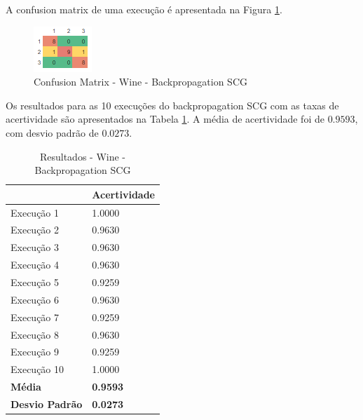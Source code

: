 A confusion matrix de uma execução é apresentada na Figura \ref{figura-confusion-matrix-wine-backpropagation-scg}.

\begin{figure}[h!]
  \centering
  \includegraphics[width=0.3\linewidth]{figs/confusion-matrix-wine-backpropagation-scg.png}
  \caption{Confusion Matrix - Wine - Backpropagation SCG}
  \label{figura-confusion-matrix-wine-backpropagation-scg}
\end{figure}

Os resultados para as 10 execuções do backpropagation SCG com as taxas de acertividade são apresentados na Tabela \ref{tabela-resultado-wine-scg}. A média de acertividade foi de $0.9593$, com desvio padrão de $0.0273$.

\begin{table}[h!]
\centering
\caption{Resultados - Wine - Backpropagation SCG}
\label{tabela-resultado-wine-scg}
\begin{tabular}{ll}
\toprule
                       & \textbf{Acertividade}       \\ \midrule
Execução 1             & 1.0000          \\
Execução 2             & 0.9630          \\
Execução 3             & 0.9630           \\
Execução 4             & 0.9630          \\
Execução 5             & 0.9259           \\
Execução 6             & 0.9630          \\
Execução 7             & 0.9259           \\
Execução 8             & 0.9630           \\
Execução 9             & 0.9259          \\
Execução 10            & 1.0000          \\ \bottomrule
\textbf{Média}         & \textbf{0.9593} \\
\textbf{Desvio Padrão} & \textbf{0.0273}
\end{tabular}
\end{table}

%
